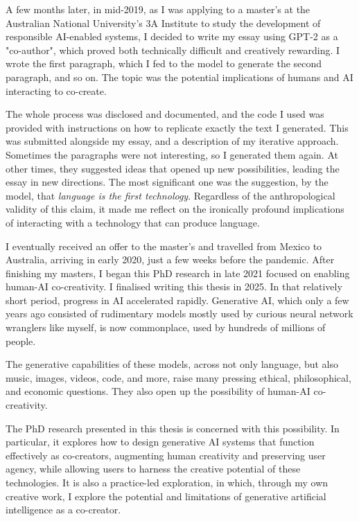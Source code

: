 A few months later, in mid-2019, as I was applying to a master's at the Australian National University's 3A Institute to study the development of responsible AI-enabled systems, I decided to write my essay using GPT-2 as a "co-author", which proved both technically difficult and creatively rewarding. I wrote the first paragraph, which I fed to the model to generate the second paragraph, and so on. The topic was the potential implications of humans and AI interacting to co-create.

The whole process was disclosed and documented, and the code I used was provided with instructions on how to replicate exactly the text I generated. This was submitted alongside my essay, and a description of my iterative approach. Sometimes the paragraphs were not interesting, so I generated them again. At other times, they suggested ideas that opened up new possibilities, leading the essay in new directions. The most significant one was the suggestion, by the model, that \textit{language is the first technology}. Regardless of the anthropological validity of this claim, it made me reflect on the ironically profound implications of interacting with a technology that can produce language.

I eventually received an offer to the master's and travelled from Mexico to Australia, arriving in early 2020, just a few weeks before the pandemic. After finishing my masters, I began this PhD research in late 2021 focused on enabling human-AI co-creativity. I finalised writing this thesis in 2025. In that relatively short period, progress in AI accelerated rapidly. Generative AI, which only a few years ago consisted of rudimentary models mostly used by curious neural network wranglers like myself, is now commonplace, used by hundreds of millions of people.

The generative capabilities of these models, across not only language, but also music, images, videos, code, and more, raise many pressing ethical, philosophical, and economic questions. They also open up the possibility of human-AI co-creativity.

The PhD research presented in this thesis is concerned with this possibility. In particular, it explores how to design generative AI systems that function effectively as co-creators, augmenting human creativity and preserving user agency, while allowing users to harness the creative potential of these technologies. It is also a practice-led exploration, in which, through my own creative work, I explore the potential and limitations of generative artificial intelligence as a co-creator. 

